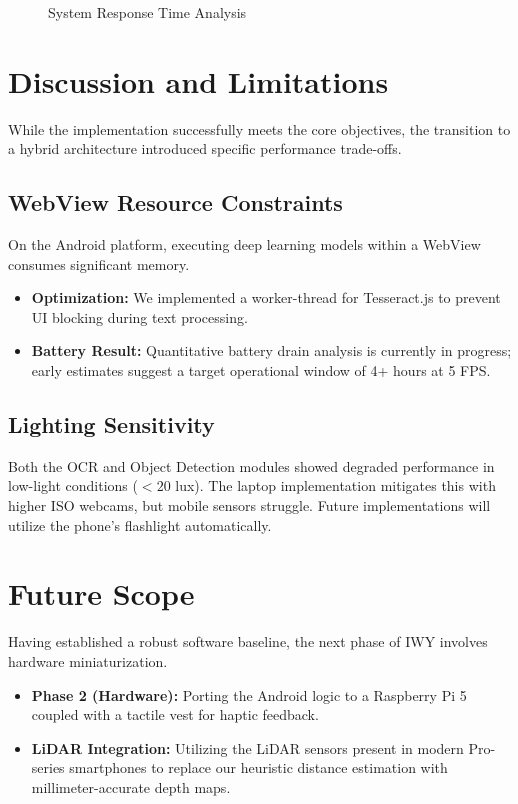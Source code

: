 \documentclass[11pt, a4paper, twocolumn]{article}
\begin{document}
\begin{figure}[h]
    \centering
    \caption{System Response Time Analysis}
    \label{fig:latency}
\end{figure}

\section{Discussion and Limitations}
While the implementation successfully meets the core objectives, the transition to a hybrid architecture introduced specific performance trade-offs.

\subsection{WebView Resource Constraints}
On the Android platform, executing deep learning models within a WebView consumes significant memory. 
\begin{itemize}
    \item \textbf{Optimization:} We implemented a worker-thread for Tesseract.js to prevent UI blocking during text processing.
    \item \textbf{Battery Result:} Quantitative battery drain analysis is currently in progress; early estimates suggest a target operational window of 4+ hours at 5 FPS.
\end{itemize}

\subsection{Lighting Sensitivity}
Both the OCR and Object Detection modules showed degraded performance in low-light conditions ($< 20$ lux). The laptop implementation mitigates this with higher ISO webcams, but mobile sensors struggle. Future implementations will utilize the phone's flashlight automatically.

\section{Future Scope}
Having established a robust software baseline, the next phase of IWY involves hardware miniaturization.
\begin{itemize}
    \item \textbf{Phase 2 (Hardware):} Porting the Android logic to a Raspberry Pi 5 coupled with a tactile vest for haptic feedback.
    \item \textbf{LiDAR Integration:} Utilizing the LiDAR sensors present in modern Pro-series smartphones to replace our heuristic distance estimation with millimeter-accurate depth maps.
\end{itemize}
\end{document}
